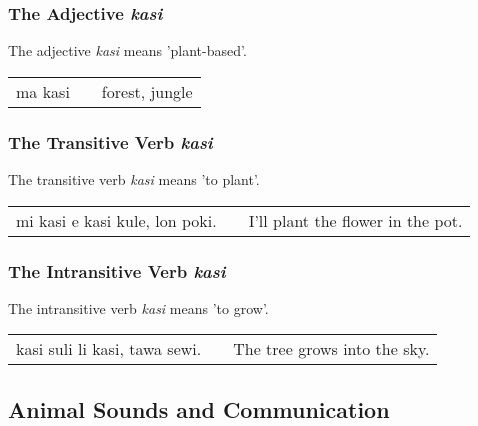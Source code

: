 %
%
\subsubsection*{The Adjective \textit{kasi}}
%
%
The adjective \textit{kasi} means 'plant-based'.

\begin{supertabular}{p{5,5cm}|ll}
    ma kasi &  & forest, jungle \\
\end{supertabular}

%
%
\subsubsection*{The Transitive Verb \textit{kasi}}
%
%
The transitive verb \textit{kasi} means 'to plant'.

\begin{supertabular}{p{5,5cm}|ll}
    mi kasi e kasi kule, lon poki. &  & I'll plant the flower in the pot. \\
\end{supertabular}

%
%
\subsubsection*{The Intransitive Verb \textit{kasi}}
%
%
The intransitive verb \textit{kasi} means 'to grow'.

\begin{supertabular}{p{5,5cm}|ll}
    kasi suli li kasi, tawa sewi. &  & The tree grows into the sky. \\
\end{supertabular}

%
%
%
%
\subsection*{Animal Sounds and Communication}
%
%

